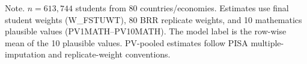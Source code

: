 \begin{table}[!t]
\centering
\caption{Population-level mathematics achievement and low-performer prevalence across the 80 PISA 2022 economies, survey-weighted to the international student population\label{tab:descriptive}}
\begin{tablenotes}
\item Note. $n = 613{,}744$ students from 80 countries/economies. Estimates use final student weights (W\_FSTUWT), 80 BRR replicate weights, and 10 mathematics plausible values (PV1MATH--PV10MATH). The model label is the row-wise mean of the 10 plausible values. PV-pooled estimates follow PISA multiple-imputation and replicate-weight conventions.
\end{tablenotes}
\end{table}
